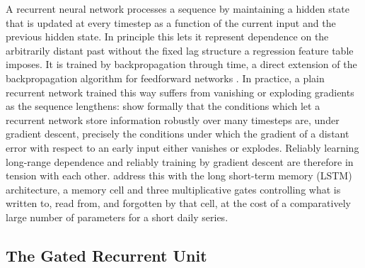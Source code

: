 \documentclass[12pt,a4paper]{report}
\begin{document}
A recurrent neural network processes a sequence by maintaining a hidden
state that is updated at every timestep as a function of the current input
and the previous hidden state. In principle this lets it represent
dependence on the arbitrarily distant past without the fixed lag structure a
regression feature table imposes. It is trained by backpropagation through
time, a direct extension of the backpropagation algorithm for feedforward
networks \citep{rumelhart1986backprop}. In practice, a plain recurrent
network trained this way suffers from vanishing or exploding gradients as
the sequence lengthens: \citet{bengio1994vanishing} show formally that the
conditions which let a recurrent network store information robustly over
many timesteps are, under gradient descent, precisely the conditions under
which the gradient of a distant error with respect to an early input either
vanishes or explodes. Reliably learning long-range dependence and reliably
training by gradient descent are therefore in tension with each other.
\citet{hochreiter1997lstm} address this with the long short-term memory
(LSTM) architecture, a memory cell and three multiplicative gates
controlling what is written to, read from, and forgotten by that cell, at
the cost of a comparatively large number of parameters for a short daily
series.

\subsection{The Gated Recurrent Unit}
\end{document}
